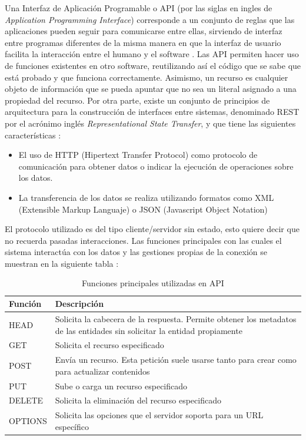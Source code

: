 Una Interfaz de Aplicación Programable o API (por las siglas en ingles de \textit{Application Programming Interface}) corresponde a un conjunto de reglas que las aplicaciones pueden seguir para comunicarse entre ellas, sirviendo de interfaz entre programas diferentes de la misma manera en que la interfaz de usuario facilita la interacción entre el humano y el software \citep{merino2014}. Las API permiten hacer uso de funciones existentes en otro software, reutilizando así el código que se sabe que está probado y que funciona correctamente. Asimismo, un recurso es cualquier objeto de información que se pueda apuntar que no sea un literal asignado a una propiedad del recurso. Por otra parte, existe un conjunto de principios de arquitectura para la construcción de interfaces entre sistemas, denominado REST por el acrónimo inglés \textit{Representational State Transfer}, y que tiene las siguientes características \citep{aporta2019}:
\begin{itemize}
\item El uso de HTTP (Hipertext Transfer Protocol) como protocolo de comunicación para obtener datos o indicar la ejecución de operaciones sobre los datos.
\item La transferencia de los datos se realiza utilizando formatos como XML (Extensible Markup Languaje) o JSON (Javascript Object Notation)
\end{itemize}

El protocolo utilizado es del tipo cliente/servidor sin estado, esto quiere decir que no recuerda pasadas interacciones. Las funciones principales con las cuales el sistema interactúa con los datos y las gestiones propias de la conexión se muestran en la siguiente tabla \citep{aporta2019}:

\begin{table}[H]
\centering
\begin{tabular}{|p{2cm}|p{4cm}|}
\hline
Función&Descripción\\
\hline
HEAD & Solicita la cabecera de la respuesta. Permite obtener los metadatos de las entidades sin solicitar la entidad propiamente\\
\hline
GET&Solicita el recurso especificado\\
\hline
POST&Envía un recurso. Esta petición suele usarse tanto para crear como para actualizar contenidos\\
\hline
PUT&Sube o carga un recurso especificado\\
\hline
DELETE&Solicita la eliminación del recurso especificado\\
\hline
OPTIONS&Solicita las opciones que el servidor soporta para un URL específico\\
\hline
\end{tabular}
\caption{Funciones principales utilizadas en API \citep{aporta2019}}
\end{table}

